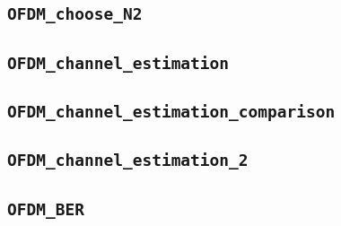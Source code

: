 \documentclass[10pt]{article}
\numberwithin{equation}{section}
\begin{document}
\subsection*{\texttt{OFDM\_choose\_N2}}


\subsection*{\texttt{OFDM\_channel\_estimation}}


\subsection*{\texttt{OFDM\_channel\_estimation\_comparison}}


\subsection*{\texttt{OFDM\_channel\_estimation\_2}}


\subsection*{\texttt{OFDM\_BER}}

\end{document}
